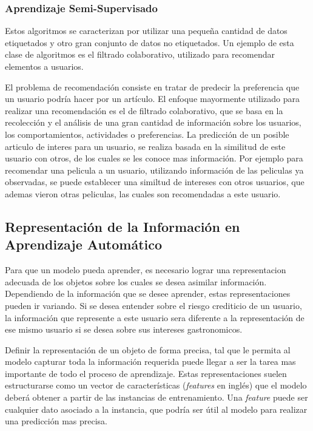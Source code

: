 \documentclass[a4paper,11pt,spanish]{book}
\begin{document}
      \subsubsection{Aprendizaje Semi-Supervisado}
	Estos algoritmos se caracterizan por utilizar una pequeña cantidad de datos etiquetados y otro gran conjunto de datos no etiquetados. Un ejemplo de esta clase de algoritmos
	es el filtrado colaborativo, utilizado para recomendar elementos a usuarios.

	El problema de recomendación consiste en tratar de predecir la preferencia que un usuario podría hacer por un artículo. El enfoque mayormente utilizado para realizar una
	recomendación es el de filtrado colaborativo, que se basa en la recolección y el análisis de una gran cantidad de información sobre los usuarios,
	los comportamientos, actividades o preferencias. La predicción de un posible articulo de interes para un usuario, se realiza basada en la similitud de este usuario con
	otros, de los cuales se les conoce mas información. Por ejemplo para recomendar una pelicula a un usuario, utilizando información de las peliculas ya observadas, se puede
	establecer una similtud de intereses con otros usuarios, que ademas vieron otras peliculas, las cuales son recomendadas a este usuario.

    \subsection{Representación de la Información en Aprendizaje Automático}
      Para que un modelo pueda aprender, es necesario lograr una representacion adecuada de los objetos sobre los cuales se desea asimilar información.
      Dependiendo de la información que se desee aprender, estas representaciones pueden ir variando. Si se desea entender sobre el riesgo crediticio de un usuario,
      la información que represente a este usuario sera diferente a la representación de ese mismo usuario si se desea  sobre sus intereses gastronomicos.

      Definir la representación de un objeto de forma precisa, tal que le permita al modelo capturar toda la información requerida puede llegar a ser la tarea mas importante de todo el 
      proceso de aprendizaje.
      Estas representaciones suelen estructurarse como un vector de características (\emph{features} en inglés) que el modelo deberá obtener a partir de las instancias de entrenamiento.
      Una \emph{feature} puede ser cualquier dato asociado a la instancia, que podría ser útil al modelo para realizar una predicción mas precisa.
\end{document}
